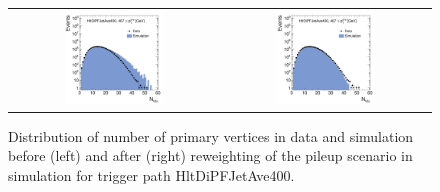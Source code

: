 \begin{figure}[!tp]
  \centering
  \begin{tabular}{cc}
                \includegraphics[width=0.49\textwidth]{figures/NVtx_HltDiPFJetAve400_AfterTriggerSelection.pdf} &
                \includegraphics[width=0.49\textwidth]{figures/NVtx_HltDiPFJetAve400_AfterPUReweighting.pdf}
  \end{tabular}
  \caption{Distribution of number of primary vertices in data and simulation before (left) and after (right) reweighting of the pileup scenario in simulation for trigger path HltDiPFJetAve400.}
  \label{fig:pu_reweight}
\end{figure}

